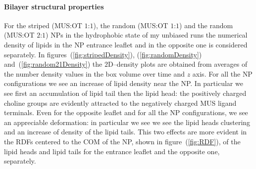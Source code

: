 \paragraph{\textbf{Bilayer structural properties}}
For the striped (\ac{MUS}:\ac{OT} $1$:$1$), the random (\ac{MUS}:\ac{OT} $1$:$1$) and the random (\ac{MUS}:\ac{OT} $2$:$1$) \acp{NP} in the hydrophobic state of my unbiased runs the numerical density of lipids in the \ac{NP} entrance leaflet and in the opposite one is considered separately. In figures~(\ref{fig:stripedDensity}), (\ref{fig:randomDensity}) and~(\ref{fig:random21Density}) the $2$D--density plots are obtained from averages of the number density values in the box volume over time and $z$ axis. For all the \ac{NP} configurations we see an increase of lipid density near the \ac{NP}. In particular we see first an accumulation of lipid tail then the lipid head: the positively charged choline groups are evidently attracted to the negatively charged \ac{MUS} ligand terminals. Even for the opposite leaflet and for all the \ac{NP} configurations, we see an appreciable deformation: in particular we see we see the lipid heads clustering and an increase of density of the lipid tails. This two effects are more evident in the \acp{RDF} centered to the \ac{COM} of the \ac{NP}, shown in figure~(\ref{fig:RDF}), of the lipid heads and lipid tails for the entrance leaflet and the opposite one, separately. 
